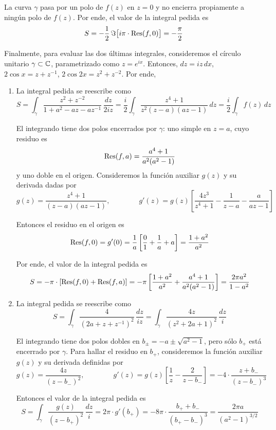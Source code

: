 \begin{solution}
\begin{enumerate}[label=(\alph*)]
    La curva $\gamma$ pasa por un polo de $f(z)$ en $z = 0$ y no encierra propiamente a ningún polo de $f(z)$. Por ende, el valor de la integral pedida es
    $$S = -\frac 12 \, \Im \big[ i\pi \cdot \operatorname{Res}(f, 0) \big] = -\frac \pi 2$$
\end{enumerate}
Finalmente, para evaluar las dos últimas integrales, consideremos el círculo unitario $\gamma \subset \mathbb C$, parametrizado como $z = e^{ix}$. Entonces, $dz = iz \, dx$, $2\cos x = z + z^{-1}$, $2\cos 2x = z^2 + z^{-2}$. Por ende,
\begin{enumerate}[label=(\alph*)]
    \setcounter {enumi} 5
    
    \item La integral pedida se reescribe como
    $$
    S
        = \int_\gamma \frac {z^2 + z^{-2}} {1 + a^2 - az - az^{-1}} \, \frac {dz} {2iz}
        = \frac i2 \int_\gamma \frac {z^4 + 1} {z^2 (z - a) (az - 1)} \, dz
        = \frac i2 \int_\gamma f(z) \, dz
    $$
    
    El integrando tiene dos polos encerrados por $\gamma$: uno simple en $z = a$, cuyo residuo es
    $$\operatorname{Res}(f, a) = \frac {a^4 + 1} {a^2 (a^2 - 1)}$$
    y uno doble en el origen. Consideremos la función auxiliar $g(z)$ y su derivada dadas por
    $$
    g(z) = \frac {z^4 + 1} {(z - a) (az - 1)}, \qquad \qquad
    g'(z) = g(z) \left[ \frac {4z^3} {z^4 + 1} - \frac 1 {z - a} - \frac a {az - 1} \right]
    $$
    
    Entonces el residuo en el origen es
    $$
    \operatorname{Res}(f, 0)
        = g'(0)
        = \frac 1a \left[ \frac 01 + \frac 1a + a \right]
        = \frac {1 + a^2} {a^2}
    $$
    
    Por ende, el valor de la integral pedida es
    $$
    S
        = -\pi \cdot [\operatorname{Res}(f, 0) + \operatorname{Res}(f, a)]
        = -\pi \left[ \frac {1 + a^2} {a^2} + \frac {a^4 + 1} {a^2 (a^2 - 1)} \right]
        = \frac {2\pi a^2} {1 - a^2}
    $$
    
    \item La integral pedida se reescribe como
    $$
    S
        = \int_\gamma \frac 4 {(2a + z + z^{-1})^2} \, \frac {dz} {iz}
        = \int_\gamma \frac {4z} {(z^2 + 2a + 1)^2} \, \frac {dz} i
    $$
    
    El integrando tiene dos polos dobles en $b_\pm = -a \pm \sqrt {a^2 - 1}$, pero sólo $b_+$ está encerrado por $\gamma$. Para hallar el residuo en $b_+$, consideremos la función auxiliar $g(z)$ y su derivada definidas por
    $$
    g(z) = \frac {4z} {(z - b_-)^2}, \qquad \qquad
    g'(z) = g(z) \left[ \frac 1z - \frac 2 {z - b_-} \right] = -4 \cdot \frac {z + b_-} {(z - b_-)^3}
    $$
    
    Entonces el valor de la integral pedida es
    $$
    S
        = \int_\gamma \frac {g(z)} {(z - b_+)^2} \, \frac {dz} i
        = 2\pi \cdot g'(b_+)
        = -8\pi \cdot \frac {b_+ + b_-} {(b_+ - b_-)^3}
        = \frac {2\pi a} {(a^2 - 1)^{3/2}}
    $$
\end{enumerate}
\end{solution}
